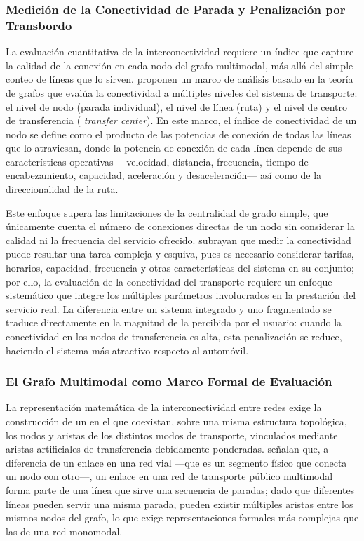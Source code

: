 \subsubsection{Medición de la Conectividad de Parada y Penalización por Transbordo}
\label{subsubsec:penalizacion-transbordo}

La evaluación cuantitativa de la interconectividad requiere un índice que
capture la calidad de la conexión en cada nodo del grafo multimodal, más allá
del simple conteo de líneas que lo sirven. \citet{mishra2015} proponen un marco
de análisis basado en la teoría de grafos que evalúa la conectividad a múltiples
niveles del sistema de transporte: el nivel de nodo (parada individual), el
nivel de línea (ruta) y el nivel de centro de transferencia (
\textit{transfer center}). En este marco, el índice de conectividad de un nodo
se define como el producto de las potencias de conexión de todas las líneas que
lo atraviesan, donde la potencia de conexión de cada línea depende de sus
características operativas ---velocidad, distancia, frecuencia, tiempo de
encabezamiento, capacidad, aceleración y desaceleración--- así como de la
direccionalidad de la ruta.

Este enfoque supera las limitaciones de la centralidad de grado simple, que
únicamente cuenta el número de conexiones directas de un nodo sin considerar la
calidad ni la frecuencia del servicio ofrecido. \citet{mishra2015} subrayan que
medir la conectividad puede resultar una tarea compleja y esquiva, pues es
necesario considerar tarifas, horarios, capacidad, frecuencia y otras
características del sistema en su conjunto; por ello, la evaluación de la
conectividad del transporte requiere un enfoque sistemático que integre los
múltiples parámetros involucrados en la prestación del servicio real. La
diferencia entre un sistema integrado y uno fragmentado se traduce directamente
en la magnitud de la  percibida por el
usuario: cuando la conectividad en los nodos de transferencia es alta, esta
penalización se reduce, haciendo el sistema más atractivo respecto al
automóvil.

\subsubsection{El Grafo Multimodal como Marco Formal de Evaluación}
\label{subsubsec:grafo-multimodal}

La representación matemática de la interconectividad entre redes exige la
construcción de un  en el que coexistan, sobre una
misma estructura topológica, los nodos y aristas de los distintos modos de
transporte, vinculados mediante aristas artificiales de transferencia
debidamente ponderadas. \citet{mishra2015} señalan que, a diferencia de un
enlace en una red vial ---que es un segmento físico que conecta un nodo con
otro---, un enlace en una red de transporte público multimodal forma parte de
una línea que sirve una secuencia de paradas; dado que diferentes líneas pueden
servir una misma parada, pueden existir múltiples aristas entre los mismos nodos
del grafo, lo que exige representaciones formales más complejas que las de una
red monomodal.

